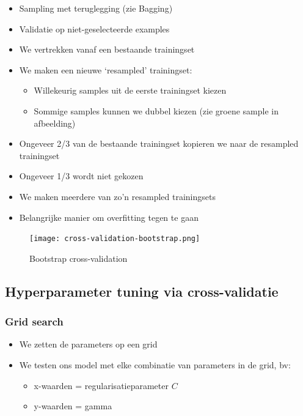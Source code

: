 \documentclass{article}
\begin{document}
\begin{itemize}
    \item Sampling met teruglegging (zie Bagging)
    \item Validatie op niet-geselecteerde examples
    \item We vertrekken vanaf een bestaande trainingset
    \item We maken een nieuwe `resampled' trainingset:
    \begin{itemize}
        \item Willekeurig samples uit de eerste trainingset kiezen
        \item Sommige samples kunnen we dubbel kiezen (zie groene sample in afbeelding)
    \end{itemize}
    \item Ongeveer 2/3 van de bestaande trainingset kopieren we naar de resampled trainingset
    \item Ongeveer 1/3 wordt niet gekozen
    \item We maken meerdere van zo'n resampled trainingsets
    \item Belangrijke manier om overfitting tegen te gaan
\end{itemize}

\begin{figure}[H]
    \centering
    \texttt{[image: cross-validation-bootstrap.png]}
    \caption{Bootstrap cross-validation}
\end{figure}

\subsection{Hyperparameter tuning via cross-validatie}

\subsubsection{Grid search}

\begin{itemize}
    \item We zetten de parameters op een grid
    \item We testen ons model met elke combinatie van parameters in de grid, bv:
    \begin{itemize}
        \item x-waarden = regularisatieparameter $C$
        \item y-waarden = gamma
    \end{itemize}
\end{itemize}
\end{document}

